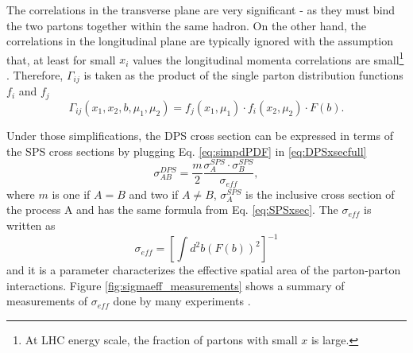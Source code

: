 The correlations in the transverse plane are very significant - as they must bind the two partons together within the same hadron. On the other hand, the correlations in the longitudinal plane are typically ignored with the assumption that, at least for small $x_i$ values the longitudinal momenta correlations are small\footnote{At LHC energy scale, the fraction of partons with small $x$ is large.} \cite{gaunt2010double}. Therefore, $\Gamma_{ij}$ is taken as the product of the single parton distribution functions $f_i$ and $f_j$
\begin{equation}\label{eq:simpdPDF}
    \Gamma_{ij}(x_1, x_2, b, \mu_1, \mu_2) = f_j(x_1, \mu_1) \cdot f_i(x_2, \mu_2) \cdot F(b).
\end{equation}

Under those simplifications, the DPS cross section can be expressed in terms of the SPS cross sections by plugging Eq. \ref{eq:simpdPDF} in \ref{eq:DPSxsecfull}
\begin{equation} \label{eq:xsecDPS}
    \sigma_{AB}^{DPS} = \frac{m}{2} \frac{\sigma_A^{SPS} \cdot \sigma_B^{SPS}}{\sigma_{eff}},
\end{equation}
where $m$ is one if $A = B$ and two if $A \neq  B$, $\sigma^{SPS}_A$ is the inclusive cross section of the process A and has the same formula from Eq. \ref{eq:SPSxsec}. The $\sigma_{eff}$ is written as
\begin{equation}\label{eq:sigmaeff}
    \sigma_{eff} = \left[ \int d^2b (F(b))^2 \right]^{-1}
\end{equation}
and it is a parameter characterizes the effective spatial area of the parton-parton interactions. Figure \ref{fig:sigmaeff_measurements} shows a summary of measurements of $\sigma_{eff}$ done by many experiments \cite{afs1987double,alitti1991study,abe1993study,cdf1997double,abazov2010double,aaij2012observation,aad2013measurement,chatrchyan2014study,abazov2014double,abazov2014observation,alconada2015observation,aaboud2016study,aaij2016production,abazov2016study,abazov2016evidence,aaij2017measurement,atlas2017measurement,khachatryan2017observation,sirunyan2018constraints}.

